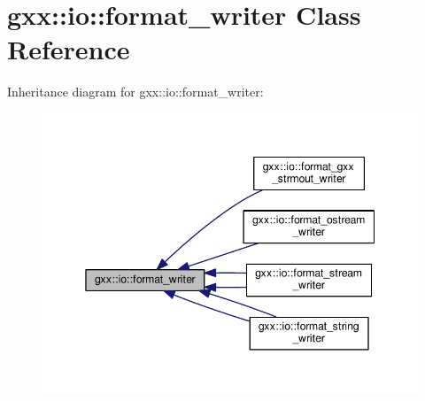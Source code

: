 \hypertarget{classgxx_1_1io_1_1format__writer}{}\section{gxx\+:\+:io\+:\+:format\+\_\+writer Class Reference}
\label{classgxx_1_1io_1_1format__writer}


Inheritance diagram for gxx\+:\+:io\+:\+:format\+\_\+writer\+:
\nopagebreak
\begin{figure}[H]
\begin{center}
\leavevmode
\includegraphics[width=345pt]{classgxx_1_1io_1_1format__writer__inherit__graph}
\end{center}
\end{figure}
